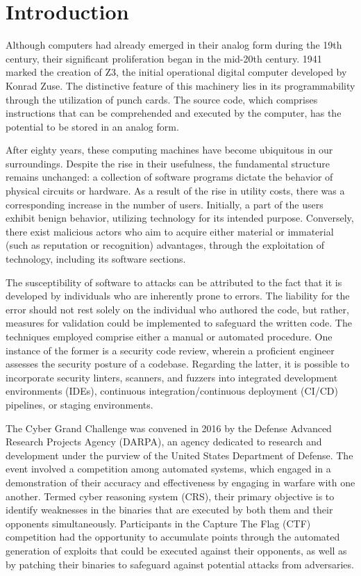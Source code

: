 \documentclass[../main.tex]{subfiles}
\begin{document}
\hypertarget{introduction}{%
  \chapter{Introduction}\label{introduction}}

Although computers had already emerged in their analog form during the 19th
century, their significant proliferation began in the mid-20th century. 1941
marked the creation of Z3, the initial operational digital computer developed
by Konrad Zuse. The distinctive feature of this machinery lies in its
programmability through the utilization of punch cards. The source code, which
comprises instructions that can be comprehended and executed by the computer,
has the potential to be stored in an analog form.

After eighty years, these computing machines have become ubiquitous in our
surroundings. Despite the rise in their usefulness, the fundamental structure
remains unchanged: a collection of software programs dictate the behavior of
physical circuits or hardware. As a result of the rise in utility costs, there
was a corresponding increase in the number of users. Initially, a part of the
users exhibit benign behavior, utilizing technology for its intended purpose.
Conversely, there exist malicious actors who aim to acquire either material or
immaterial (such as reputation or recognition) advantages, through the
exploitation of technology, including its software sections.

The susceptibility of software to attacks can be attributed to the fact that it
is developed by individuals who are inherently prone to errors. The liability
for the error should not rest solely on the individual who authored the code,
but rather, measures for validation could be implemented to safeguard the
written code. The techniques employed comprise either a manual or automated
procedure. One instance of the former is a security code review, wherein a
proficient engineer assesses the security posture of a codebase. Regarding the
latter, it is possible to incorporate security linters, scanners, and fuzzers
into integrated development environments (IDEs), continuous
integration/continuous deployment (CI/CD) pipelines, or staging environments.

The Cyber Grand Challenge was convened in 2016 by the Defense Advanced Research
Projects Agency (DARPA), an agency dedicated to research and development under
the purview of the United States Department of Defense. The event involved a
competition among automated systems, which engaged in a demonstration of their
accuracy and effectiveness by engaging in warfare with one another. Termed
cyber reasoning system (CRS), their primary objective is to identify weaknesses
in the binaries that are executed by both them and their opponents
simultaneously. Participants in the Capture The Flag (CTF) competition had the
opportunity to accumulate points through the automated generation of exploits
that could be executed against their opponents, as well as by patching their
binaries to safeguard against potential attacks from adversaries.
\end{document}
